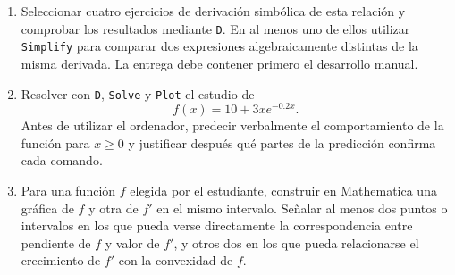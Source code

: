 \begin{enumerate}[label=\textbf{\arabic*.},leftmargin=*]
\item \M Seleccionar cuatro ejercicios de derivación simbólica de esta relación y comprobar los resultados mediante \texttt{D}. En al menos uno de ellos utilizar \texttt{Simplify} para comparar dos expresiones algebraicamente distintas de la misma derivada. La entrega debe contener primero el desarrollo manual.

\item \M Resolver con \texttt{D}, \texttt{Solve} y \texttt{Plot} el estudio de
\[
f(x)=10+3xe^{-0.2x}.
\]
Antes de utilizar el ordenador, predecir verbalmente el comportamiento de la función para $x\geq0$ y justificar después qué partes de la predicción confirma cada comando.

\item \M Para una función $f$ elegida por el estudiante, construir en Mathematica una gráfica de $f$ y otra de $f'$ en el mismo intervalo. Señalar al menos dos puntos o intervalos en los que pueda verse directamente la correspondencia entre pendiente de $f$ y valor de $f'$, y otros dos en los que pueda relacionarse el crecimiento de $f'$ con la convexidad de $f$.

\end{enumerate}
